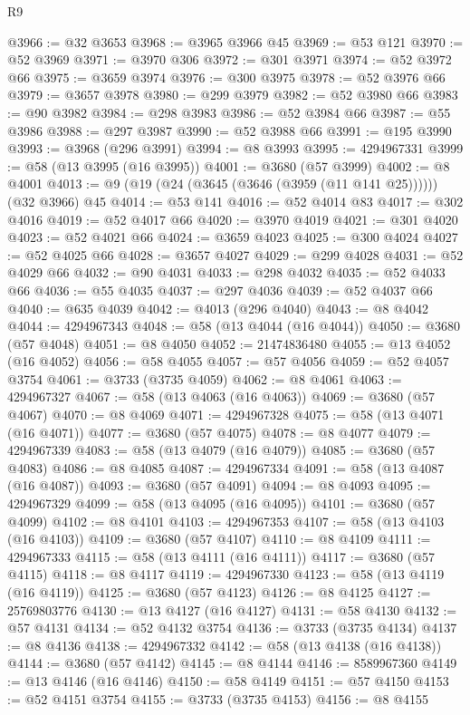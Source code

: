 \begin{lexlean}{R9}
\begin{coremodule}
@3966 := @32 @3653
@3968 := @3965 @3966 @45
@3969 := @53 @121
@3970 := @52 @3969
@3971 := @3970 @306
@3972 := @301 @3971
@3974 := @52 @3972 @66
@3975 := @3659 @3974
@3976 := @300 @3975
@3978 := @52 @3976 @66
@3979 := @3657 @3978
@3980 := @299 @3979
@3982 := @52 @3980 @66
@3983 := @90 @3982
@3984 := @298 @3983
@3986 := @52 @3984 @66
@3987 := @55 @3986
@3988 := @297 @3987
@3990 := @52 @3988 @66
@3991 := @195 @3990
@3993 := @3968 (@296 @3991)
@3994 := @8 @3993
@3995 := 4294967331
@3999 := @58 (@13 @3995 (@16 @3995))
@4001 := @3680 (@57 @3999)
@4002 := @8 @4001
@4013 := @9 (@19 (@24 (@3645 (@3646 (@3959 (@11 @141 @25)))))) (@32 @3966) @45
@4014 := @53 @141
@4016 := @52 @4014 @83
@4017 := @302 @4016
@4019 := @52 @4017 @66
@4020 := @3970 @4019
@4021 := @301 @4020
@4023 := @52 @4021 @66
@4024 := @3659 @4023
@4025 := @300 @4024
@4027 := @52 @4025 @66
@4028 := @3657 @4027
@4029 := @299 @4028
@4031 := @52 @4029 @66
@4032 := @90 @4031
@4033 := @298 @4032
@4035 := @52 @4033 @66
@4036 := @55 @4035
@4037 := @297 @4036
@4039 := @52 @4037 @66
@4040 := @635 @4039
@4042 := @4013 (@296 @4040)
@4043 := @8 @4042
@4044 := 4294967343
@4048 := @58 (@13 @4044 (@16 @4044))
@4050 := @3680 (@57 @4048)
@4051 := @8 @4050
@4052 := 21474836480
@4055 := @13 @4052 (@16 @4052)
@4056 := @58 @4055
@4057 := @57 @4056
@4059 := @52 @4057 @3754
@4061 := @3733 (@3735 @4059)
@4062 := @8 @4061
@4063 := 4294967327
@4067 := @58 (@13 @4063 (@16 @4063))
@4069 := @3680 (@57 @4067)
@4070 := @8 @4069
@4071 := 4294967328
@4075 := @58 (@13 @4071 (@16 @4071))
@4077 := @3680 (@57 @4075)
@4078 := @8 @4077
@4079 := 4294967339
@4083 := @58 (@13 @4079 (@16 @4079))
@4085 := @3680 (@57 @4083)
@4086 := @8 @4085
@4087 := 4294967334
@4091 := @58 (@13 @4087 (@16 @4087))
@4093 := @3680 (@57 @4091)
@4094 := @8 @4093
@4095 := 4294967329
@4099 := @58 (@13 @4095 (@16 @4095))
@4101 := @3680 (@57 @4099)
@4102 := @8 @4101
@4103 := 4294967353
@4107 := @58 (@13 @4103 (@16 @4103))
@4109 := @3680 (@57 @4107)
@4110 := @8 @4109
@4111 := 4294967333
@4115 := @58 (@13 @4111 (@16 @4111))
@4117 := @3680 (@57 @4115)
@4118 := @8 @4117
@4119 := 4294967330
@4123 := @58 (@13 @4119 (@16 @4119))
@4125 := @3680 (@57 @4123)
@4126 := @8 @4125
@4127 := 25769803776
@4130 := @13 @4127 (@16 @4127)
@4131 := @58 @4130
@4132 := @57 @4131
@4134 := @52 @4132 @3754
@4136 := @3733 (@3735 @4134)
@4137 := @8 @4136
@4138 := 4294967332
@4142 := @58 (@13 @4138 (@16 @4138))
@4144 := @3680 (@57 @4142)
@4145 := @8 @4144
@4146 := 8589967360
@4149 := @13 @4146 (@16 @4146)
@4150 := @58 @4149
@4151 := @57 @4150
@4153 := @52 @4151 @3754
@4155 := @3733 (@3735 @4153)
@4156 := @8 @4155

\end{coremodule}
\end{lexlean}
